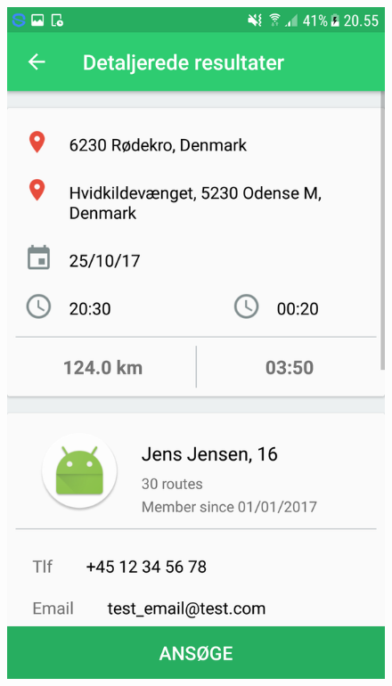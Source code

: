 \begin{figure}[H]
\begin{minipage}{0.32\textwidth}
    \includegraphics[width=0.8\linewidth]{Graphics/Images/bikebus_detail_1.png}
\end{minipage}\hfill
\begin{minipage}{0.32\textwidth}
\centering

\end{minipage}
\end{figure}
